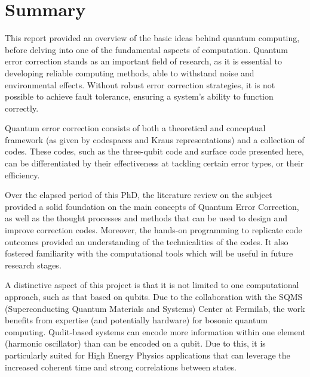 \chapter{Summary}

This report provided an overview of the basic ideas behind quantum computing, before delving into one of the fundamental aspects of computation. Quantum error correction stands as an important field of research, as it is essential to developing reliable computing methods, able to withstand noise and environmental effects. Without robust error correction strategies, it is not possible to achieve fault tolerance, ensuring a system's ability to function correctly. 

Quantum error correction consists of both a theoretical and conceptual framework (as given by codespaces and Kraus representations) and a collection of codes. These codes, such as the three-qubit code and surface code presented here, can be differentiated by their effectiveness at tackling certain error types, or their efficiency.

Over the elapsed period of this PhD, the literature review on the subject provided a solid foundation on the main concepts of Quantum Error Correction, as well as the thought processes and methods that can be used to design and improve correction codes. Moreover, the hands-on programming to replicate code outcomes provided an understanding of the technicalities of the codes. It also fostered familiarity with the computational tools which will be useful in future research stages.

A distinctive aspect of this project is that it is not limited to one computational approach, such as that based on qubits. Due to the collaboration with the SQMS (Superconducting Quantum Materials and Systems) Center at Fermilab, the work benefits from expertise (and potentially hardware) for bosonic quantum computing. Qudit-based systems can encode more information within one element (harmonic oscillator) than can be encoded on a qubit. Due to this, it is particularly suited for High Energy Physics applications that can leverage the increased coherent time and strong correlations between states.